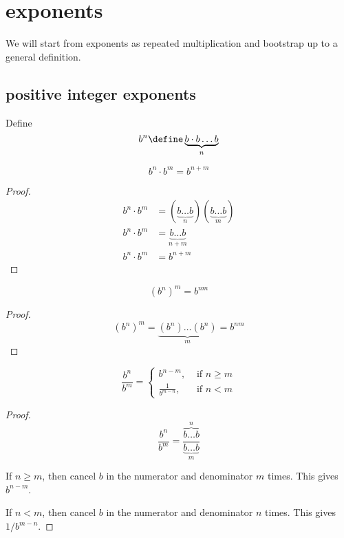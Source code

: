 \documentclass[10pt]{scrartcl}
\begin{document}
\section{exponents}
We will start from exponents as repeated multiplication and bootstrap up to a general definition. 
\subsection{positive integer exponents}
\begin{defn}
  Define 
  \[
  b^n\define \underbrace{b\cdot b \dots b}_n
  \]
\end{defn}

\begin{theorem} \label{th:exp-mult}
  \begin{equation}
    \label{eq:exp-mult}
    b^n \cdot b^m = b^{n+m}
  \end{equation}
\end{theorem}
\begin{proof}
  \begin{align*}
    b^n\cdot b^m &= (\underbrace{b\dots b}_n) (\underbrace{b\dots b}_m) \\
    b^n\cdot b^m &= \underbrace{b\dots b}_{n+m} \\
    b^n\cdot b^m &= b^{n+m}
  \end{align*}
\end{proof}
\begin{cor}
  \label{th:exp-exp}
  \begin{equation}
    \label{eq:exp-exp}
    \left(b^n\right)^m = b^{nm}
  \end{equation}
\end{cor}
\begin{proof}
  \[
  (b^n)^m = \underbrace{(b^n)\dots (b^n)}_m = b^{nm}
  \]
\end{proof}

\begin{cor}
  \label{th:exp-div0}
  \begin{equation}
    \label{eq:exp-div0}
    \frac{b^n}{b^m}=
    \begin{cases}
      b^{n-m},&\textrm{ if } n\geq m \\
      \frac{1}{b^{m-n}},&\textrm{ if } n < m
    \end{cases}
  \end{equation}
\end{cor}
\begin{proof}
  \[
  \frac{b^n}{b^m}=\frac{\overbrace{b\dots b}^n}{\underbrace{b\dots b}_m}
  \]

  If $n\geq m$, then cancel $b$ in the numerator and denominator $m$ times. This gives $b^{n-m}$. 
  
If $n<m$, then cancel $b$ in the numerator and denominator $n$ times. This gives $1/b^{m-n}$. 
\end{proof}
\end{document}
